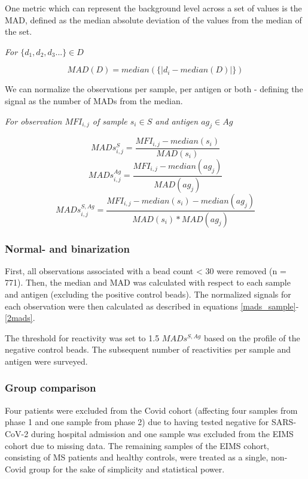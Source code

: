 \documentclass{article}
\begin{document}
One metric which can represent the background level across a set of values is the MAD, defined as the median absolute deviation of the values from the median of the set.
\begin{center}
    \textit{For $\{d_1,d_2,d_3...\} \in D$}
\end{center}
\begin{equation}
    MAD(D) = median( \{ | d_i - median(D) | \} )
\end{equation}

We can normalize the observations per sample, per antigen or both - defining the signal as the number of MADs from the median.

\begin{center}
    \textit{For observation $MFI_{i,j}$ of sample $s_i \in S$ and antigen $ag_j \in Ag$}
\end{center}
\begin{equation}\label{mads_sample}
    MADs^{S}_{i,j} = \frac{MFI_{i,j} - median(s_i)}{MAD(s_i)}
\end{equation}
\begin{equation}\label{mads_ag}
    MADs^{Ag}_{i,j} = \frac{MFI_{i,j} - median(ag_j)}{MAD(ag_j)}
\end{equation}
\begin{equation}\label{2mads}
    MADs^{S,Ag}_{i,j} = \frac{MFI_{i,j} - median(s_i) - median(ag_j)}{MAD(s_i)*MAD(ag_j)}
\end{equation}


\subsubsection{Normal- and binarization}
First, all observations associated with a bead count < 30 were removed (n = 771). Then, the median and MAD was calculated with respect to each sample and antigen (excluding the positive control beads). The normalized signals for each observation were then calculated as described in equations \ref{mads_sample}-\ref{2mads}.

The threshold for reactivity was set to 1.5 $MADs^{S,Ag}$ based on the profile of the negative control beads. The subsequent number of reactivities per sample and antigen were surveyed.

\subsubsection{Group comparison}\label{method_group_comp}
Four patients were excluded from the Covid cohort (affecting four samples from phase 1 and one sample from phase 2) due to having tested negative for SARS-CoV-2 during hospital admission and one sample was excluded from the EIMS cohort due to missing data. The remaining samples of the EIMS cohort, consisting of MS patients and healthy controls, were treated as a single, non-Covid group for the sake of simplicity and statistical power.
\end{document}
